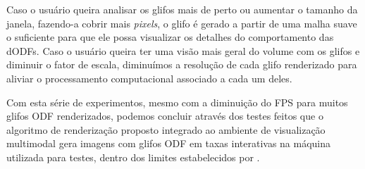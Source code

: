 
Caso o usuário queira analisar os glifos mais de perto ou aumentar o tamanho da janela, fazendo-a cobrir mais \textit{pixels}, o glifo é gerado a partir de uma malha suave o suficiente para que ele possa visualizar os detalhes do comportamento das dODFs. Caso o usuário queira ter uma visão mais geral do volume com os glifos e diminuir o fator de escala, diminuímos a resolução de cada glifo renderizado para aliviar o processamento computacional associado a cada um deles. %


Com esta série de experimentos, mesmo com a diminuição do FPS para muitos glifos ODF renderizados, podemos concluir através dos testes feitos que o algoritmo de renderização proposto integrado ao ambiente de visualização multimodal gera imagens com glifos ODF em taxas interativas na máquina utilizada para testes, dentro dos limites estabelecidos por .


